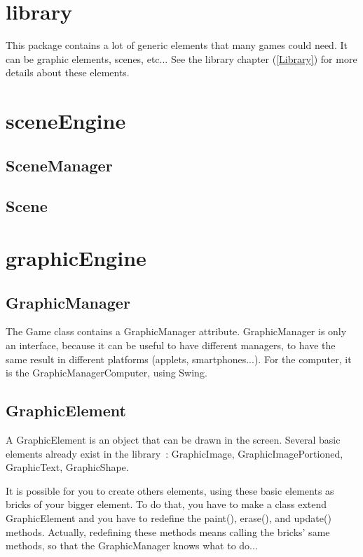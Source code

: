 \documentclass[a4paper,11pt]{report}
\begin{document}
	\section{library}
		
		This package contains a lot of generic elements that many games could need.
		It can be graphic elements, scenes, etc...
		See the library chapter (\ref{Library}) for more details about these elements.
	
	\section{sceneEngine} \label{SceneEngine}
		\subsection{SceneManager}
		\subsection{Scene}
	
	\section{graphicEngine}
		\subsection{GraphicManager}
			The Game class contains a GraphicManager attribute. GraphicManager is only an interface, because it can be useful
			to have different managers, to have the same result in different platforms (applets, smartphones...).
			For the computer, it is the GraphicManagerComputer, using Swing.
		
		\subsection{GraphicElement}
			A GraphicElement is an object that can be drawn in the screen.
			Several basic elements already exist in the library~: GraphicImage, GraphicImagePortioned, GraphicText, GraphicShape.
			
			It is possible for you to create others elements, using these basic elements as bricks of your bigger element.
			To do that, you have to make a class extend GraphicElement and you have to redefine the paint(), erase(), and update() methods.
			Actually, redefining these methods means calling the bricks' same methods, so that the GraphicManager knows what to do...
			
\end{document}
